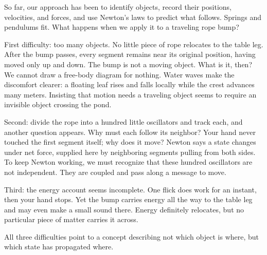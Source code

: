 \begin{mainline}
So far, our approach has been to identify objects, record their positions, velocities, and forces, and use Newton's laws to predict what follows. Springs and pendulums fit. What happens when we apply it to a traveling rope bump?

First difficulty: too many objects. No little piece of rope relocates to the table leg. After the bump passes, every segment remains near its original position, having moved only up and down. The bump is not a moving object. What is it, then? We cannot draw a free-body diagram for nothing. Water waves make the discomfort clearer: a floating leaf rises and falls locally while the crest advances many meters. Insisting that motion needs a traveling object seems to require an invisible object crossing the pond.

Second: divide the rope into a hundred little oscillators and track each, and another question appears. Why must each follow its neighbor? Your hand never touched the first segment itself; why does it move? Newton says a state changes under net force, supplied here by neighboring segments pulling from both sides. To keep Newton working, we must recognize that these hundred oscillators are not independent. They are coupled and pass along a message to move.

Third: the energy account seems incomplete. One flick does work for an instant, then your hand stops. Yet the bump carries energy all the way to the table leg and may even make a small sound there. Energy definitely relocates, but no particular piece of matter carries it across.

All three difficulties point to a concept describing not which object is where, but which state has propagated where.
\end{mainline}


